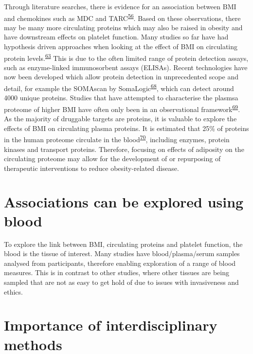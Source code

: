 \documentclass[11pt,twoside]{bristolthesis}
\begin{document}
Through literature searches, there is evidence for an association between BMI and chemokines such as MDC and TARC\textsuperscript{\protect\hyperlink{ref-Kitahara2014}{56}}. Based on these observations, there may be many more circulating proteins which may also be raised in obesity and have downstream effects on platelet function. Many studies so far have had hypothesis driven approaches when looking at the effect of BMI on circulating protein levels.\textsuperscript{\protect\hyperlink{ref-Timpson2011}{63}} This is due to the often limited range of protein detection assays, such as enzyme-linked immunosorbent assays (ELISAs). Recent technologies have now been developed which allow protein detection in unprecedented scope and detail, for example the SOMAscan by SomaLogic\textsuperscript{\protect\hyperlink{ref-Gold2012}{68}}, which can detect around 4000 unique proteins. Studies that have attempted to characterise the plasmsa proteome of higher BMI have often only been in an observational framework\textsuperscript{\protect\hyperlink{ref-Cominetti2018}{69}}. As the majority of druggable targets are proteins, it is valuable to explore the effects of BMI on circulating plasma proteins. It is estimated that 25\% of proteins in the human proteome circulate in the blood\textsuperscript{\protect\hyperlink{ref-Imming2006}{70}}, including enzymes, protein kinases and transport proteins. Therefore, focusing on effects of adiposity on the circulating proteome may allow for the development of or repurposing of therapeutic interventions to reduce obesity-related disease.

\hypertarget{associations-can-be-explored-using-blood}{%
\section{Associations can be explored using blood}\label{associations-can-be-explored-using-blood}}

To explore the link between BMI, circulating proteins and platelet function, the blood is the tissue of interest. Many studies have blood/plasma/serum samples analysed from participants, therefore enabling exploration of a range of blood measures. This is in contrast to other studies, where other tissues are being sampled that are not as easy to get hold of due to issues with invasiveness and ethics.

\hypertarget{importance-of-interdisciplinary-methods}{%
\section{Importance of interdisciplinary methods}\label{importance-of-interdisciplinary-methods}}
\end{document}
